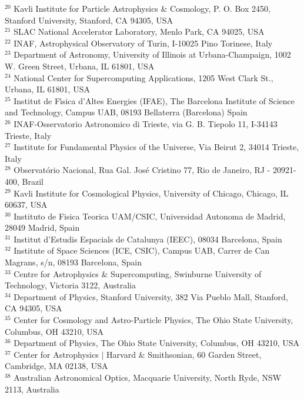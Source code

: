 {$^{20}$ Kavli Institute for Particle Astrophysics \& Cosmology, P. O. Box 2450, Stanford University, Stanford, CA 94305, USA\\
$^{21}$ SLAC National Accelerator Laboratory, Menlo Park, CA 94025, USA\\
$^{22}$ INAF, Astrophysical Observatory of Turin, I-10025 Pino Torinese, Italy\\
$^{23}$ Department of Astronomy, University of Illinois at Urbana-Champaign, 1002 W. Green Street, Urbana, IL 61801, USA\\
$^{24}$ National Center for Supercomputing Applications, 1205 West Clark St., Urbana, IL 61801, USA\\
$^{25}$ Institut de F\'{\i}sica d'Altes Energies (IFAE), The Barcelona Institute of Science and Technology, Campus UAB, 08193 Bellaterra (Barcelona) Spain\\
$^{26}$ INAF-Osservatorio Astronomico di Trieste, via G. B. Tiepolo 11, I-34143 Trieste, Italy\\
$^{27}$ Institute for Fundamental Physics of the Universe, Via Beirut 2, 34014 Trieste, Italy\\
$^{28}$ Observat\'orio Nacional, Rua Gal. Jos\'e Cristino 77, Rio de Janeiro, RJ - 20921-400, Brazil\\
$^{29}$ Kavli Institute for Cosmological Physics, University of Chicago, Chicago, IL 60637, USA\\
$^{30}$ Instituto de Fisica Teorica UAM/CSIC, Universidad Autonoma de Madrid, 28049 Madrid, Spain\\
$^{31}$ Institut d'Estudis Espacials de Catalunya (IEEC), 08034 Barcelona, Spain\\
$^{32}$ Institute of Space Sciences (ICE, CSIC),  Campus UAB, Carrer de Can Magrans, s/n,  08193 Barcelona, Spain\\
$^{33}$ Centre for Astrophysics \& Supercomputing, Swinburne University of Technology, Victoria 3122, Australia\\
$^{34}$ Department of Physics, Stanford University, 382 Via Pueblo Mall, Stanford, CA 94305, USA\\
$^{35}$ Center for Cosmology and Astro-Particle Physics, The Ohio State University, Columbus, OH 43210, USA\\
$^{36}$ Department of Physics, The Ohio State University, Columbus, OH 43210, USA\\
$^{37}$ Center for Astrophysics $\vert$ Harvard \& Smithsonian, 60 Garden Street, Cambridge, MA 02138, USA\\
$^{38}$ Australian Astronomical Optics, Macquarie University, North Ryde, NSW 2113, Australia\\
}
